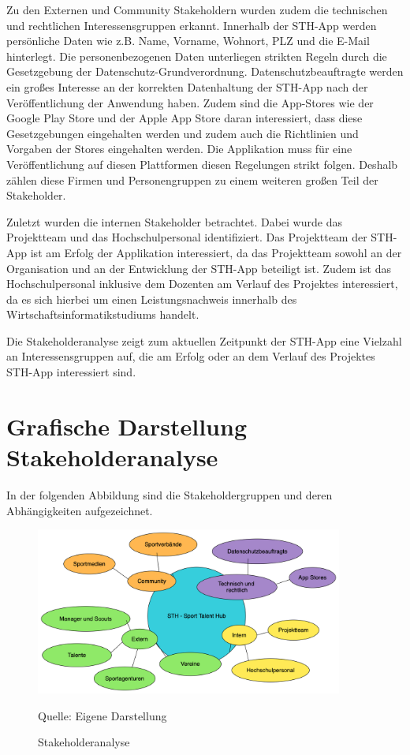 \noindent
Zu den Externen und Community Stakeholdern wurden zudem die technischen und rechtlichen Interessensgruppen erkannt.
Innerhalb der STH-App werden persönliche Daten wie z.B. Name, Vorname, Wohnort, PLZ und die E-Mail hinterlegt.
Die personenbezogenen Daten unterliegen strikten Regeln durch die Gesetzgebung der Datenschutz-Grundverordnung.
Datenschutzbeauftragte werden ein großes Interesse an der korrekten Datenhaltung der STH-App nach der Veröffentlichung der Anwendung haben.
Zudem sind die App-Stores wie der Google Play Store und der Apple App Store daran interessiert, dass diese Gesetzgebungen eingehalten werden und zudem auch die Richtlinien und Vorgaben der Stores eingehalten werden.
Die Applikation muss für eine Veröffentlichung auf diesen Plattformen diesen Regelungen strikt folgen.
Deshalb zählen diese Firmen und Personengruppen zu einem weiteren großen Teil der Stakeholder.

\noindent
Zuletzt wurden die internen Stakeholder betrachtet.
Dabei wurde das Projektteam und das Hochschulpersonal identifiziert.
Das Projektteam der STH-App ist am Erfolg der Applikation interessiert, da das Projektteam sowohl an der Organisation und an der Entwicklung der STH-App beteiligt ist.
Zudem ist das Hochschulpersonal inklusive dem Dozenten am Verlauf des Projektes interessiert, da es sich hierbei um einen Leistungsnachweis innerhalb des Wirtschaftsinformatikstudiums handelt.

\noindent
Die Stakeholderanalyse zeigt zum aktuellen Zeitpunkt der STH-App eine Vielzahl an Interessensgruppen auf, die am Erfolg oder an dem Verlauf des Projektes STH-App interessiert sind.


\section{Grafische Darstellung Stakeholderanalyse}

In der folgenden Abbildung sind die Stakeholdergruppen und deren Abhängigkeiten aufgezeichnet.
\begin{figure}[H]
	\setcounter{figure}{4} 
	\caption[Stakeholderanalyse]{Stakeholderanalyse}
	\centering
	\includegraphics[width=0.9\textwidth]{assets/figures/Stakeholderanalyse.png}
	\begin{flushleft}
		Quelle: Eigene Darstellung
	\end{flushleft}
\end{figure}


